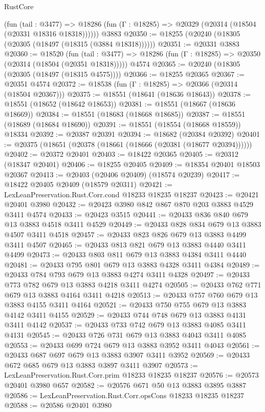 \begin{lexlean}{RustCore}
\begin{coremodule}
      (fun (tail : @3477) =>
      @18286 (fun (Γ : @18285) => @20329 (@20314 (@18504 (@20331 @18316 @18318))))))
    @3883
@20350 := @18255 (@20240 (@18305 (@20305 (@18497 (@18315 (@3884 @18318))))))
@20351 := @20331 @3883
@20360 := @18520
    (fun (tail : @3477) => @18286 (fun (Γ : @18285) => @20350 (@20314 (@18504 (@20351 @18318)))))
    @4574
@20365 := @20240 (@18305 (@20305 (@18497 (@18315 @4575))))
@20366 := @18255 @20365
@20367 := @20351 @4574
@20372 := @18538 (fun (Γ : @18285) => @20366 (@20314 (@18504 @20367)))
@20375 := @18551 (@18641 (@18636 @18643))
@20378 := @18551 (@18652 (@18642 @18653))
@20381 := @18551 (@18667 (@18636 @18669))
@20384 := @18551 (@18683 (@18668 @18685))
@20387 := @18551 (@18689 (@18684 @18690))
@20391 := @18551 (@18554 (@18668 @18559)) @18334
@20392 := @20387 @20391
@20394 := @18682 (@20384 @20392)
@20401 := @20375 (@18651 (@20378 (@18661 (@18666 (@20381 (@18677 @20394))))))
@20402 := @20372 @20401
@20403 := @18422 @20365
@20405 := @20312 (@18347 @20401)
@20406 := @18255 @20405
@20409 := @18354 @20401 @18503 @20367
@20413 := @20403 (@20406 @20409) (@18574 @20239)
@20417 := @18422 @20405 @20409 (@18579 @20311)
@20421 := LexLeanPreservation.Rust.Corr.cond @18233 @18235 @18237
@20423 := @20421 @20401 @3980
@20432 := @20423 @3980 @842 @867 @870 @203 @3883 @4529 @3411 @4574
@20433 := @20423 @3515
@20441 := @20433 @836 @840 @679 @13 @3883 @4518 @3411 @4529
@20449 := @20433 @828 @834 @679 @13 @3883 @4507 @3411 @4518
@20457 := @20433 @823 @826 @679 @13 @3883 @4499 @3411 @4507
@20465 := @20433 @813 @821 @679 @13 @3883 @4440 @3411 @4499
@20473 := @20433 @803 @811 @679 @13 @3883 @4384 @3411 @4440
@20481 := @20433 @795 @801 @679 @13 @3883 @4328 @3411 @4384
@20489 := @20433 @784 @793 @679 @13 @3883 @4274 @3411 @4328
@20497 := @20433 @773 @782 @679 @13 @3883 @4218 @3411 @4274
@20505 := @20433 @762 @771 @679 @13 @3883 @4164 @3411 @4218
@20513 := @20433 @757 @760 @679 @13 @3883 @4155 @3411 @4164
@20521 := @20433 @750 @755 @679 @13 @3883 @4142 @3411 @4155
@20529 := @20433 @744 @748 @679 @13 @3883 @4131 @3411 @4142
@20537 := @20433 @733 @742 @679 @13 @3883 @4085 @3411 @4131
@20545 := @20433 @726 @731 @679 @13 @3883 @4043 @3411 @4085
@20553 := @20433 @699 @724 @679 @13 @3883 @3952 @3411 @4043
@20561 := @20433 @687 @697 @679 @13 @3883 @3907 @3411 @3952
@20569 := @20433 @672 @685 @679 @13 @3883 @3897 @3411 @3907
@20573 := LexLeanPreservation.Rust.Corr.prim @18233 @18235 @18237
@20576 := @20573 @20401 @3980 @657
@20582 := @20576 @671 @50 @13 @3883 @3895 @3887
@20586 := LexLeanPreservation.Rust.Corr.opsCons @18233 @18235 @18237
@20588 := @20586 @20401 @3980

\end{coremodule}
\end{lexlean}

